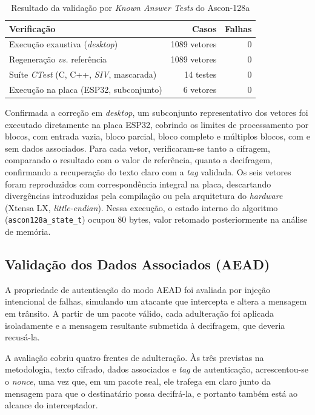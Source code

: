 \begin{table}[htb]
\centering
\caption{Resultado da validação por \textit{Known Answer Tests} do Ascon-128a}
\label{tab:kat_ascon128a}
\begin{tabular}{lrr}
\hline
\textbf{Verificação} & \textbf{Casos} & \textbf{Falhas} \\
\hline
Execução exaustiva (\textit{desktop})                  & 1089 vetores & 0 \\
Regeneração \textit{vs.} referência                    & 1089 vetores & 0 \\
Suíte \textit{CTest} (C, C++, \textit{SIV}, mascarada) & 14 testes    & 0 \\
Execução na placa (ESP32, subconjunto)                 & 6 vetores    & 0 \\
\hline
\end{tabular}
\end{table}

Confirmada a correção em \textit{desktop}, um subconjunto representativo dos vetores foi executado diretamente na placa ESP32, cobrindo os limites de processamento por blocos, com entrada vazia, bloco parcial, bloco completo e múltiplos blocos, com e sem dados associados. Para cada vetor, verificaram-se tanto a cifragem, comparando o resultado com o valor de referência, quanto a decifragem, confirmando a recuperação do texto claro com a \textit{tag} validada. Os seis vetores foram reproduzidos com correspondência integral na placa, descartando divergências introduzidas pela compilação ou pela arquitetura do \textit{hardware} (Xtensa LX, \textit{little-endian}). Nessa execução, o estado interno do algoritmo (\texttt{ascon128a\_state\_t}) ocupou 80 bytes, valor retomado posteriormente na análise de memória.


\subsection{Validação dos Dados Associados (AEAD)}
\label{subsec:aead_resultados}

A propriedade de autenticação do modo AEAD foi avaliada por injeção intencional de falhas, simulando um atacante que intercepta e altera a mensagem em trânsito. A partir de um pacote válido, cada adulteração foi aplicada isoladamente e a mensagem resultante submetida à decifragem, que deveria recusá-la.

A avaliação cobriu quatro frentes de adulteração. Às três previstas na metodologia, texto cifrado, dados associados e \textit{tag} de autenticação, acrescentou-se o \textit{nonce}, uma vez que, em um pacote real, ele trafega em claro junto da mensagem para que o destinatário possa decifrá-la, e portanto também está ao alcance do interceptador.

